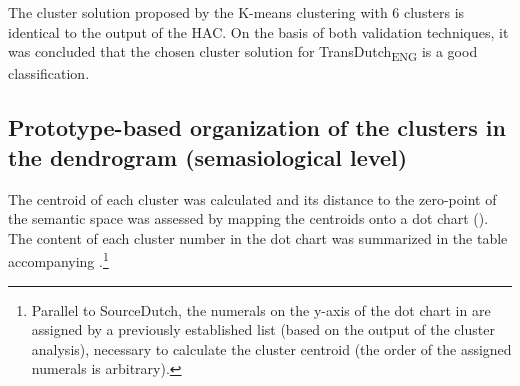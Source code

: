 The cluster solution proposed by the K-means clustering with 6 clusters is identical to the output of the HAC. On the basis of both validation techniques, it was concluded that the chosen cluster solution for TransDutch\textsubscript{ENG} is a good classification.

\subsection{Prototype-based organization of the clusters in the dendrogram (semasiological level)}
\label{sec:4.3.2}  
The centroid of each cluster was calculated and its distance to the zero-point of the semantic space was assessed by mapping the centroids onto a dot chart (). The content of each cluster number in the dot chart was summarized in the table accompanying .\footnote{Parallel to SourceDutch, the numerals on the y-axis of the dot chart in  are assigned by a previously established list (based on the output of the cluster analysis), necessary to calculate the cluster centroid (the order of the assigned numerals is arbitrary).}

